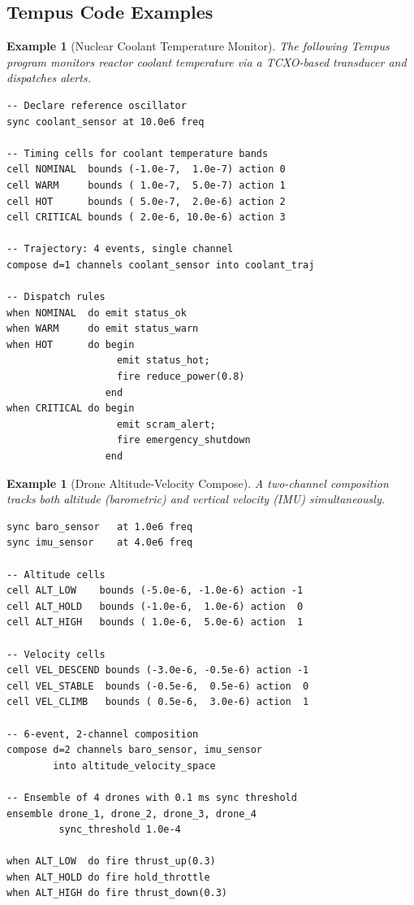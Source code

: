 \documentclass[twocolumn,10pt]{article}
\newtheorem{example}[theorem]{Example}
\begin{document}
\subsection{Tempus Code Examples}

\begin{example}[Nuclear Coolant Temperature Monitor]
\label{ex:nuclear}
The following Tempus program monitors reactor coolant temperature
via a TCXO-based transducer and dispatches alerts.
\begin{lstlisting}[language=Tempus, caption={Nuclear coolant monitor in Tempus.}, label=lst:nuclear]
-- Declare reference oscillator
sync coolant_sensor at 10.0e6 freq

-- Timing cells for coolant temperature bands
cell NOMINAL  bounds (-1.0e-7,  1.0e-7) action 0
cell WARM     bounds ( 1.0e-7,  5.0e-7) action 1
cell HOT      bounds ( 5.0e-7,  2.0e-6) action 2
cell CRITICAL bounds ( 2.0e-6, 10.0e-6) action 3

-- Trajectory: 4 events, single channel
compose d=1 channels coolant_sensor into coolant_traj

-- Dispatch rules
when NOMINAL  do emit status_ok
when WARM     do emit status_warn
when HOT      do begin
                   emit status_hot;
                   fire reduce_power(0.8)
                 end
when CRITICAL do begin
                   emit scram_alert;
                   fire emergency_shutdown
                 end
\end{lstlisting}
\end{example}

\begin{example}[Drone Altitude-Velocity Compose]
\label{ex:drone}
A two-channel composition tracks both altitude (barometric) and
vertical velocity (IMU) simultaneously.
\begin{lstlisting}[language=Tempus, caption={Drone dual-channel trajectory.}, label=lst:drone]
sync baro_sensor   at 1.0e6 freq
sync imu_sensor    at 4.0e6 freq

-- Altitude cells
cell ALT_LOW    bounds (-5.0e-6, -1.0e-6) action -1
cell ALT_HOLD   bounds (-1.0e-6,  1.0e-6) action  0
cell ALT_HIGH   bounds ( 1.0e-6,  5.0e-6) action  1

-- Velocity cells
cell VEL_DESCEND bounds (-3.0e-6, -0.5e-6) action -1
cell VEL_STABLE  bounds (-0.5e-6,  0.5e-6) action  0
cell VEL_CLIMB   bounds ( 0.5e-6,  3.0e-6) action  1

-- 6-event, 2-channel composition
compose d=2 channels baro_sensor, imu_sensor
        into altitude_velocity_space

-- Ensemble of 4 drones with 0.1 ms sync threshold
ensemble drone_1, drone_2, drone_3, drone_4
         sync_threshold 1.0e-4

when ALT_LOW  do fire thrust_up(0.3)
when ALT_HOLD do fire hold_throttle
when ALT_HIGH do fire thrust_down(0.3)
\end{lstlisting}
\end{example}
\end{document}
